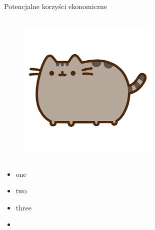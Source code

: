 \begin{columnframe}{Potencjalne korzyści ekonomiczne}
    \begin{column}{0.5\textwidth}
        \begin{figure}
            \centering
            \includegraphics[width=0.6\textwidth, frame]{images/pusheen.png}
        \end{figure}
    \end{column}
    \begin{column}{0.5\textwidth}
        \begin{itemize}
            \item one \keV
            \item two \MeV
            \item three \GeV
            \item \aegis
        \end{itemize}
    \end{column}
\end{columnframe}

